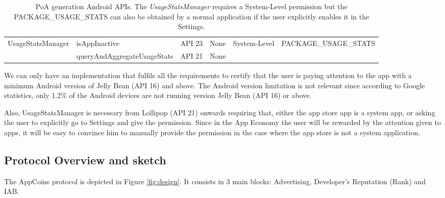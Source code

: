 \begin{table}[H]
\begin{tabular}{|l|l|l|l|l|l|}
\multirow{2}{*}{UsageStatsManager} & isAppInactive               & API 23 & None                  & \multirow{2}{*}{System-Level} & \multirow{2}{*}{PACKAGE\_USAGE\_STATS} \\ \cline{2-4}
                                   & queryAndAggregateUsageStats & API 21    & None                  &                                &                                        \\ \hline
\end{tabular}
\caption{\textsf{PoA} generation Android APIs. The \textit{UsageStatsManager} requires a System-Level permission but the PACKAGE\_USAGE\_STATS can also be obtained by a normal application if the user explicitly enables it in the Settings.}
\label{table: permissions}
\end{table}

We can only have an implementation that fulfils all the requirements to certify that the user is paying 
attention to the app with a minimum Android version of Jelly Bean (API 16) and above. The Android 
version limitation is not relevant since according to Google statistics, only 1.2\% of the Android devices are not running version Jelly Bean (API 16) or above. %

Also, UsageStatsManager is necessary from Lollipop (API 21) onwards requiring that, either the app 
store app is a system app, or asking the user to explicitly go to Settings and give the permission. Since 
in the App Economy the user will be rewarded by the attention given to apps, it will be easy to convince 
him to manually provide the permission in the case where the app store is not a system application.


\subsection{Protocol Overview and sketch}


The AppCoins protocol is depicted in Figure \ref{fig:design}. It consists in 3 main blocks: Advertising, 
Developer's Reputation (Rank) and IAB.

